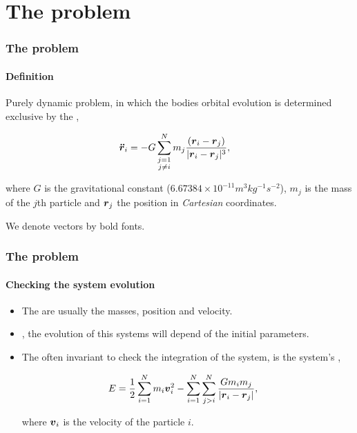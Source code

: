 \section{The {\nbody} problem}
\begin{frame}
    \frametitle{The {\nbody} problem}
    \framesubtitle{Definition}

    Purely dynamic problem, in which the bodies orbital evolution
    is determined exclusive by the ,

    \begin{align}
        \boldsymbol{\ddot{r}}_{i} &= -G \sum\limits^{N}_{\substack{j=1\\j\neq i}}
                              m_{j} {(\boldsymbol{r}_i - \boldsymbol{r}_j)\over
                              | \boldsymbol{r}_i - \boldsymbol{r}_j|^{3}}\label{eq:nbody},
    \end{align}

    \noindent
    where $G$ is the gravitational constant
    ($6.67384\times 10^{-11} m^{3} kg^{-1} s^{-2}$),
    $m_j$ is the mass of the $j$th particle
    and $\boldsymbol{r}_j$ the position in \emph{Cartesian} coordinates.
    \begin{block}{}
        We denote vectors by bold fonts.
    \end{block}
\end{frame}


\begin{frame}
    \frametitle{The {\nbody} problem}
    \framesubtitle{Checking the system evolution}

    \begin{itemize}
        \item The  are usually the masses,
            position and velocity.

        \item {}, the evolution of this systems
         will depend of the initial parameters.

        \item The often invariant to check the integration of the system,
            is the system's ,

            \begin{align}
                E &= {1 \over 2} \sum\limits^{N}_{i=1} m_{i} \boldsymbol{v}_{i}^{2} -
                     \sum\limits_{i=1}^{N} \sum\limits_{j > i}^{N}
                     {G m_{i} m_{j} \over |\boldsymbol{r}_{i} - \boldsymbol{r}_{j}|},
            \end{align}

            \noindent
            where $\boldsymbol{v}_i$ is the velocity of the particle $i$.
    \end{itemize}

\end{frame}


